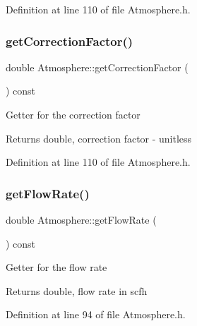 Definition at line 110 of file Atmosphere.\+h.

\mbox{\label{class_atmosphere_a79c94343c7b6659b2f79688a1ba69aed}} 
\subsubsection{\texorpdfstring{get\+Correction\+Factor()}{getCorrectionFactor()}\hspace{0.1cm}{\footnotesize\ttfamily [3/3]}}
{\footnotesize\ttfamily double Atmosphere\+::get\+Correction\+Factor (\begin{DoxyParamCaption}{ }\end{DoxyParamCaption}) const\hspace{0.3cm}{\ttfamily [inline]}}

Getter for the correction factor \begin{DoxyReturn}{Returns}
double, correction factor -\/ unitless 
\end{DoxyReturn}


Definition at line 110 of file Atmosphere.\+h.

\mbox{\label{class_atmosphere_ad34708b12c8c9af4fce47669d68ebf4d}} 
\subsubsection{\texorpdfstring{get\+Flow\+Rate()}{getFlowRate()}\hspace{0.1cm}{\footnotesize\ttfamily [1/3]}}
{\footnotesize\ttfamily double Atmosphere\+::get\+Flow\+Rate (\begin{DoxyParamCaption}{ }\end{DoxyParamCaption}) const\hspace{0.3cm}{\ttfamily [inline]}}

Getter for the flow rate \begin{DoxyReturn}{Returns}
double, flow rate in scfh 
\end{DoxyReturn}


Definition at line 94 of file Atmosphere.\+h.

\mbox{\label{class_atmosphere_ad34708b12c8c9af4fce47669d68ebf4d}} 
